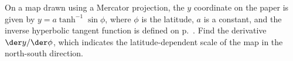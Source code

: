 On a map drawn using a Mercator projection, the $y$ coordinate on the paper
is given by $y=a \tanh^{-1}\sin\phi$, where $\phi$ is the latitude, $a$
is a constant, and the inverse hyperbolic tangent function is defined on
p.~\pageref{def-hyperbolic}. Find the derivative $\der y/\der\phi$, which indicates the
latitude-dependent scale of the map in the north-south direction.\answercheck
